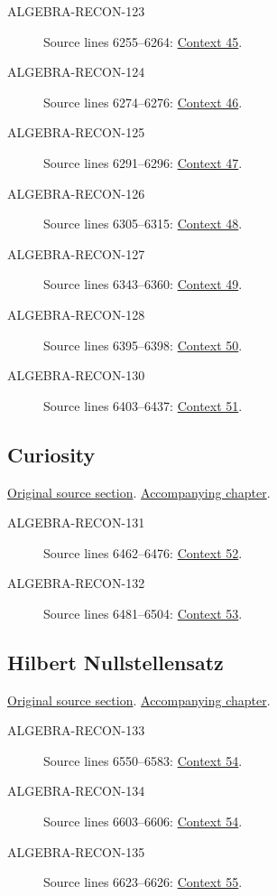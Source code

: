 \begin{description}
\item[ALGEBRA-RECON-123] Source lines 6255--6264: \hyperlink{algebra-context-045}{Context 45}.
\item[ALGEBRA-RECON-124] Source lines 6274--6276: \hyperlink{algebra-context-046}{Context 46}.
\item[ALGEBRA-RECON-125] Source lines 6291--6296: \hyperlink{algebra-context-047}{Context 47}.
\item[ALGEBRA-RECON-126] Source lines 6305--6315: \hyperlink{algebra-context-048}{Context 48}.
\item[ALGEBRA-RECON-127] Source lines 6343--6360: \hyperlink{algebra-context-049}{Context 49}.
\item[ALGEBRA-RECON-128] Source lines 6395--6398: \hyperlink{algebra-context-050}{Context 50}.
\item[ALGEBRA-RECON-130] Source lines 6403--6437: \hyperlink{algebra-context-051}{Context 51}.
\end{description}

\subsection{Curiosity}
\hypertarget{algebra-source-section-curiosity}{}
\noindent\href{https://github.com/stacks/stacks-project/blob/a04446e57ec1fbc252a871afcec7752fb2807b14/algebra.tex\#L6445}{Original source section}. \href{algebra.pdf\#nameddest=section-curiosity}{Accompanying chapter}.

\begin{description}
\item[ALGEBRA-RECON-131] Source lines 6462--6476: \hyperlink{algebra-context-052}{Context 52}.
\item[ALGEBRA-RECON-132] Source lines 6481--6504: \hyperlink{algebra-context-053}{Context 53}.
\end{description}

\subsection{Hilbert Nullstellensatz}
\hypertarget{algebra-source-section-nullstellensatz}{}
\noindent\href{https://github.com/stacks/stacks-project/blob/a04446e57ec1fbc252a871afcec7752fb2807b14/algebra.tex\#L6520}{Original source section}. \href{algebra.pdf\#nameddest=section-nullstellensatz}{Accompanying chapter}.

\begin{description}
\item[ALGEBRA-RECON-133] Source lines 6550--6583: \hyperlink{algebra-context-054}{Context 54}.
\item[ALGEBRA-RECON-134] Source lines 6603--6606: \hyperlink{algebra-context-054}{Context 54}.
\item[ALGEBRA-RECON-135] Source lines 6623--6626: \hyperlink{algebra-context-055}{Context 55}.
\end{description}

